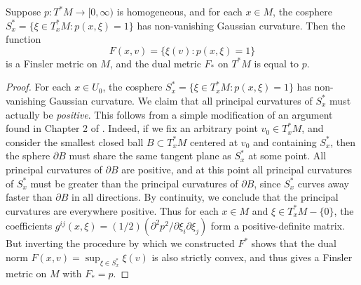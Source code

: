 \begin{lemma}
  Suppose $p: T^* M \to [0,\infty)$ is homogeneous, and for each $x \in M$, the cosphere $S_x^* = \{ \xi \in T_x^* M : p(x,\xi) = 1 \}$ has non-vanishing Gaussian curvature. Then the function
  \[ F(x,v) = \{ \xi(v) : p(x,\xi) = 1 \} \]
  is a Finsler metric on $M$, and the dual metric $F_*$ on $T^*M$ is equal to $p$.
\end{lemma}
\begin{proof}
  For each $x \in U_0$, the cosphere $S_x^* = \{ \xi \in T_x^* M : p(x,\xi) = 1 \}$ has non-vanishing Gaussian curvature. We claim that all principal curvatures of $S_x^*$ must actually be \emph{positive}. This follows from a simple modification of an argument found in Chapter 2 of \cite{HeinzHopf}. Indeed, if we fix an arbitrary point $v_0 \in T_x^*M$, and consider the smallest closed ball $B \subset T_x^* M$ centered at $v_0$ and containing $S_x^*$, then the sphere $\partial B$ must share the same tangent plane as $S_x^*$ at some point. All principal curvatures of $\partial B$ are positive, and at this point all principal curvatures of $S_x^*$ must be greater than the principal curvatures of $\partial B$, since $S_x^*$ curves away faster than $\partial B$ in all directions. By continuity, we conclude that the principal curvatures are everywhere positive.  Thus for each $x \in M$ and $\xi \in T_x^* M - \{ 0 \}$, the coefficients $g^{ij}(x,\xi) = (1/2) (\partial^2 p^2 / \partial \xi_i \partial \xi_j)$ form a positive-definite matrix. But inverting the procedure by which we constructed $F^*$ shows that the dual norm $F(x,v) = \sup\nolimits_{\xi \in S_x^*} \xi(v)$ is also strictly convex, and thus gives a Finsler metric on $M$ with $F_* = p$. %
\end{proof}

%


